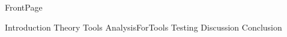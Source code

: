\documentclass{article}
\begin{document}
{FrontPage}

\frontmatter


\mainmatter

\newpage
\tableofcontents
\newpage
\listoffigures
\listoftables


\printglossary[type=\acronymtype]
\printglossary
\newpage


{Introduction}
\newpage
{Theory}
\newpage
{Tools}
\newpage
{AnalysisForTools}
\newpage
{Testing}
\newpage
{Discussion}
\newpage
{Conclusion}


\newpage
\printbibliography[heading = bibintoc, title = Bibliography]    





\end{document}
